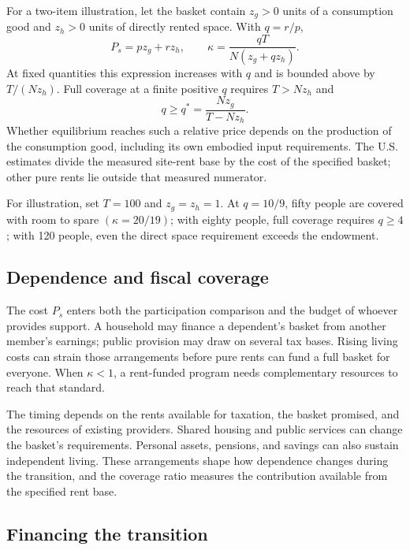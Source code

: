 \documentclass[12pt]{article}
\theoremstyle{plain}
\theoremstyle{definition}
\theoremstyle{remark}
\begin{document}
For a two-item illustration, let the basket contain $z_g>0$ units of a consumption good and $z_h>0$ units of directly rented space. With $q=r/p$,
\[
P_s=pz_g+rz_h,\qquad
\kappa=\frac{qT}{N(z_g+qz_h)}.
\]
At fixed quantities this expression increases with $q$ and is bounded above by $T/(Nz_h)$. Full coverage at a finite positive $q$ requires $T>Nz_h$ and
\[
q\ge q^*=\frac{Nz_g}{T-Nz_h}.
\]
Whether equilibrium reaches such a relative price depends on the production of the consumption good, including its own embodied input requirements. The U.S. estimates divide the measured site-rent base by the cost of the specified basket; other pure rents lie outside that measured numerator.

For illustration, set $T=100$ and $z_g=z_h=1$. At $q=10/9$, fifty people are covered with room to spare $(\kappa=20/19)$; with eighty people, full coverage requires $q\ge4$; with 120 people, even the direct space requirement exceeds the endowment.

\subsection{Dependence and fiscal coverage}\label{app:D.4}

The cost $P_s$ enters both the participation comparison and the budget of whoever provides support. A household may finance a dependent's basket from another member's earnings; public provision may draw on several tax bases. Rising living costs can strain those arrangements before pure rents can fund a full basket for everyone. When $\kappa<1$, a rent-funded program needs complementary resources to reach that standard.

The timing depends on the rents available for taxation, the basket promised, and the resources of existing providers. Shared housing and public services can change the basket's requirements. Personal assets, pensions, and savings can also sustain independent living. These arrangements shape how dependence changes during the transition, and the coverage ratio measures the contribution available from the specified rent base.

\subsection{Financing the transition}\label{app:D.5}
\end{document}
